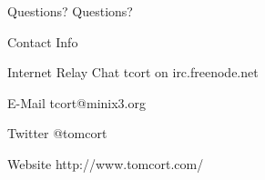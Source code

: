 \documentclass{beamer}
\begin{document}
\begin{frame}{Questions?}
  \centering
  Questions?
\end{frame}

\begin{frame}{Contact Info}
\begin{block}{Internet Relay Chat}
tcort on irc.freenode.net
\end{block}
\begin{block}{E-Mail}
tcort@minix3.org
\end{block}
\begin{block}{Twitter}
@tomcort
\end{block}
\begin{block}{Website}
http://www.tomcort.com/
\end{block}
\end{frame}
\end{document}
